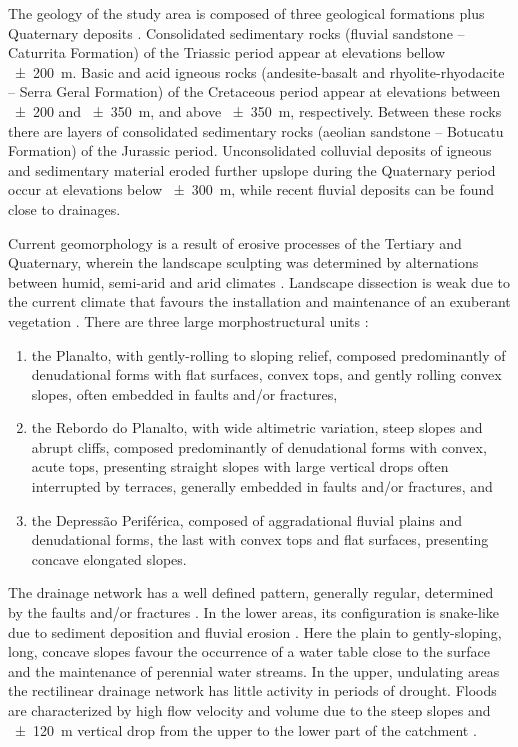 The geology of the study area is composed of three geological formations plus Quaternary deposits
\cite{GasparettoEtAl1988,MacielFilho1990,Sartori2009}. Consolidated sedimentary rocks (fluvial
sandstone -- Caturrita Formation) of the Triassic period appear at elevations bellow \SI{\pm200}{\metre}.
Basic and acid igneous rocks (andesite-basalt and rhyolite-rhyodacite -- Serra Geral Formation) of the
Cretaceous period appear at elevations between \num{\pm200} and \SI{\pm350}{\metre}, and above
\SI{\pm350}{\metre}, respectively. Between these rocks there are layers of consolidated sedimentary
rocks (aeolian sandstone -- Botucatu Formation) of the Jurassic period. Unconsolidated colluvial
deposits of igneous and sedimentary material eroded further upslope during the Quaternary period
occur at elevations below \SI{\pm300}{\metre}, while recent fluvial deposits can be found close to
drainages.

Current geomorphology is a result of erosive processes of the Tertiary and Quaternary, wherein the
landscape sculpting was determined by alternations between humid, semi-arid and arid climates
\cite{Sartori2009}. Landscape dissection is weak due to the current climate that favours the
installation and maintenance of an exuberant vegetation \cite{Sartori2009,NascimentoEtAl2010}.
There are three large morphostructural units \cite{GasparettoEtAl1988,NascimentoEtAl2010}:

\begin{enumerate}[label=(\alph*)]
	\item the Planalto, with gently-rolling to sloping relief, composed predominantly of
	denudational forms with flat surfaces, convex tops, and gently rolling convex slopes, often
	embedded in faults and/or fractures,

	\item the Rebordo do Planalto, with wide altimetric variation, steep slopes and abrupt
	cliffs, composed predominantly of denudational forms with convex, acute tops, presenting
	straight slopes with large vertical drops often interrupted by terraces, generally embedded
	in faults and/or fractures, and

	\item the Depressão Periférica, composed of aggradational fluvial plains and denudational
	forms, the last with convex tops and flat surfaces, presenting concave elongated slopes.
\end{enumerate}

The drainage network has a well defined pattern, generally regular, determined by the faults and/or
fractures \cite{Bortoluzzi1974,GasparettoEtAl1988,NascimentoEtAl2010}. In the lower areas, its
configuration is snake-like due to sediment deposition and fluvial erosion
\cite{PaivaEtAl2001,SutiliEtAl2009}. Here the plain to gently-sloping, long, concave slopes favour the
occurrence of a
water table close to the surface and the maintenance of perennial water streams. In the upper,
undulating areas the rectilinear drainage network has little activity in periods of drought. Floods
are characterized by high flow velocity and volume due to the steep slopes and \SI{\pm120}{\metre}
vertical drop from the upper to the lower part of the catchment \cite{PaivaEtAl2001,SutiliEtAl2009}.

